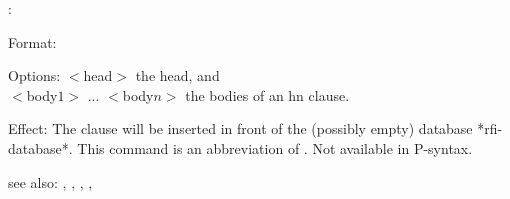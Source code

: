\aNullhn:

Format: 

Options: $<$head$>$ the head, and\\
	 $<$body$1>$ ... $<$body$n>$ the bodies of an hn clause.

Effect: The clause 
        will be inserted in front of the
        (possibly empty) database *rfi-database*.
	This command is an abbreviation of 
        .
        Not available in P-syntax.

see also: \aNull, \aNullft, \consult, \destroy, \replace
